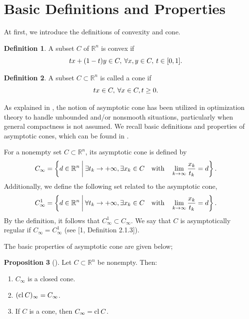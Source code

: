 \documentclass[a4paper,11pt]{jsarticle}
\theoremstyle{definition}
\newtheorem{dfn}{Definition}[section]
\newtheorem{prop}[dfn]{Proposition}
\newcommand{\NDemenstionalRealEuclideanSpace}{\mathbb{R}^n}
\newcommand{\With}{\quad\text{with}\quad}
\newcommand{\Closure}[1]{\text{\rm cl\:${#1}$}} %
\begin{document}
\section{\rm Basic Definitions and Properties}

At first, we introduce the definitions of convexity and cone.

\begin{dfn}
  A subset $C$ of $\NDemenstionalRealEuclideanSpace$ is convex if
  \begin{equation}
    tx + (1-t)y \in C,\:\forall x,y \in C,\:t \in [0,1].\notag
  \end{equation}
\end{dfn}

\begin{dfn}
  A subset $C \subset \NDemenstionalRealEuclideanSpace$ is called a cone if
  \begin{equation}
    tx \in C,\:\forall x \in C, t\geq0. \notag
  \end{equation}
\end{dfn}

As explained in \cite{Auslender03}, the notion of asymptotic cone has been utilized in optimization theory to handle unbounded and/or nonsmooth situations, particularly when general compactness is not assumed. We recall basic definitions and properties of asymptotic cones, which can be found in \cite{Auslender03}.

For a nonempty set $C \subset \NDemenstionalRealEuclideanSpace$, its asymptotic cone is defined by
\begin{equation}
  C_\infty = \left\{ d \in
  \mathbb{R}^n \:\middle|\: \exists t_k \rightarrow +\infty, \exists x_k \in C \With \lim_{k \to \infty} \frac{x_k}{t_k} = d \right\}. \notag
\end{equation}
Additionally, we define the following set related to the asymptotic cone,
\begin{equation}
  C_{\infty}^1 = \left\{d \in \NDemenstionalRealEuclideanSpace \:\middle|\: \forall t_k \rightarrow + \infty , \exists x_k \in C \With \lim_{k \to \infty} \frac{x_k}{t_k} = d \right\}. \notag
\end{equation}
By the definition, it follows that $C_{\infty}^1 \subset C_{\infty}$. We say that $C$ is asymptotically regular if $C_{\infty} = C_{\infty}^1$ (see [1, Definition 2.1.3]).

The basic properties of asymptotic cone are given below;

\begin{prop}[\cite{Auslender03}]
  Let $C \subset \NDemenstionalRealEuclideanSpace$ be nonempty. Then:
  \begin{enumerate}[label=\roman*,align=CenterWithParen]
    \item $C_{\infty}$ is a closed cone.
    \item $(\Closure{C})_{\infty} = C_{\infty}$.
    \item If $C$ is a cone, then $C_{\infty} = \Closure{C}$.
  \end{enumerate}
\end{prop}
\end{document}
